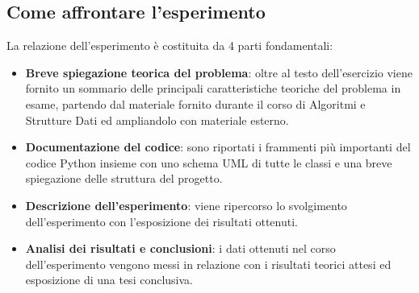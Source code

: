 	\subsection{Come affrontare l'esperimento}
		La relazione dell'esperimento è costituita da 4 parti fondamentali:
		\begin{itemize}
			\item \textbf{Breve spiegazione teorica del problema}: oltre al testo dell'esercizio viene fornito un sommario delle principali caratteristiche teoriche del problema in esame, partendo dal materiale fornito durante il corso di Algoritmi e Strutture Dati ed ampliandolo con materiale esterno.
			\item \textbf{Documentazione del codice}: sono riportati i frammenti più importanti del codice Python insieme con uno schema UML di tutte le classi e una breve spiegazione delle struttura del progetto.
			\item \textbf{Descrizione dell'esperimento}: viene ripercorso lo svolgimento dell'esperimento con l'esposizione dei risultati ottenuti.
			\item \textbf{Analisi dei risultati e conclusioni}: i dati ottenuti nel corso dell'esperimento vengono messi in relazione con i risultati teorici attesi ed esposizione di una tesi conclusiva.
		\end{itemize}
		